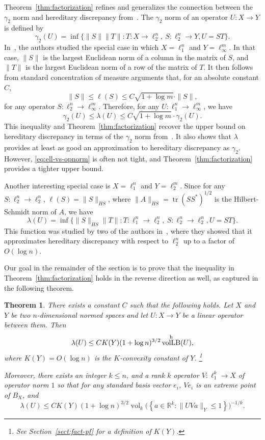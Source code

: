 \documentclass[11pt]{article}
\newtheorem{theorem}{Theorem}
\newcommand{\R}{{\mathbb{R}}}
\newcommand{\set}[1]{\left\{ #1 \right\}}
\DeclareMathOperator{\vollb}{volLB}
\DeclareMathOperator{\vol}{vol}
\DeclareMathOperator{\tr}{tr}
\begin{document}
Theorem~\ref{thm:factorization} refines and generalizes the connection
between the $\gamma_2$ norm and hereditary discrepancy
from~\cite{disc-gamma2}. The $\gamma_2$ norm of an operator $U:X \to
Y$ is defined by
\[
\gamma_2(U) = \inf\{\|S\| \|T\|:  T: X \to \ell_2^n,\ S: \ell_2^n
\to Y, U = ST\}.
\]
In~\cite{disc-gamma2}, the authors studied the special case in which
$X = \ell_1^n$ and $Y = \ell_\infty^m$. In that case, $\|S\|$ is the
largest Euclidean norm of a column in the matrix of $S$, and $\|T\|$
is the largest Euclidean norm of a row of the matrix of $T$. It then
follows from standard concentration of measure arguments that, for an absolute constant $C$,
\begin{equation}
  \label{eq:ell-vs-opnorm}
  \|S\| \le \ell(S) \le C\sqrt{1 + \log m} \cdot\|S\|,
\end{equation}
for any operator $S: \ell_2^n \to \ell_\infty^m$. Therefore,
for any $U:\ell_1^n \to \ell_\infty^m$, we have 
\[
\gamma_2(U) \le \lambda(U) \le C\sqrt{1 + \log m}\cdot \gamma_2(U).
\]
This inequality and Theorem~\ref{thm:factorization} recover the upper
bound on hereditary discrepancy in terms of the $\gamma_2$ norm
from~\cite{disc-gamma2}. It also shows that $\lambda$ provides at
least as good an approximation to hereditary discrepancy as $\gamma_2$.
However, \eqref{eq:ell-vs-opnorm} is often
not tight, and Theorem~\ref{thm:factorization} provides a tighter
upper bound.

Another interesting special case is $X = \ell_1^n$ and $Y =
\ell_2^m$. Since for any $S:\ell_2^n\to \ell_2^n$, $\ell(S) =
\|S\|_{HS}$, where $\|A\|_{HS} = \tr(SS^*)^{1/2}$ is the
Hilbert-Schmidt norm of $A$, we have
\[
\lambda(U) = \inf\{\|S\|_{HS}\|T\|: 
T: \ell_1^n \to \ell_2^n,\ S: \ell_2^n \to \ell_2^n, U = ST\}.
\]
This function was studied by two of the authors in~\cite{NT15}, where
they showed that it approximates hereditary discrepancy with respect
to $\ell_2^n$ up to a factor of $O(\log n)$. 

Our goal in the remainder of the section is to prove that the
inequality in Theorem~\ref{thm:factorization} holds in the reverse
direction as well, as captured in the following theorem.

\begin{theorem}\label{thm:fact-vollb}
  There exists a constant $C$ such that the following holds. Let $X$
  and $Y$ be two $n$-dimensional normed spaces and let $U:X \to Y$ be
  a linear operator between them.
  Then
  \[
  \lambda(U) \le C K(Y) (1 + \log n)^{3/2}\vollb^{\rm h}(U),
  \]
  where $K(Y) = O(\log n)$ is the $K$-convexity constant of $Y$.
  \footnote{See Section~\ref{sect:fact-pf} for a definition of
    $K(Y)$.}  
  
  Moreover, there exists an integer $k\le n$, and a rank $k$ operator
  $V:\ell_1^k\to X$ of operator norm $1$ so that for any standard
  basis vector $e_i$, $Ve_i$ is an extreme point of $B_X$, and
  \[
  \lambda(U) \le C K(Y) (1 + \log n)^{3/2}
  \vol_k\bigl(\set{a \in \R^k: \|UV a\|_Y \le 1}\bigr)^{-1/k}.
  \]
\end{theorem}
\end{document}
